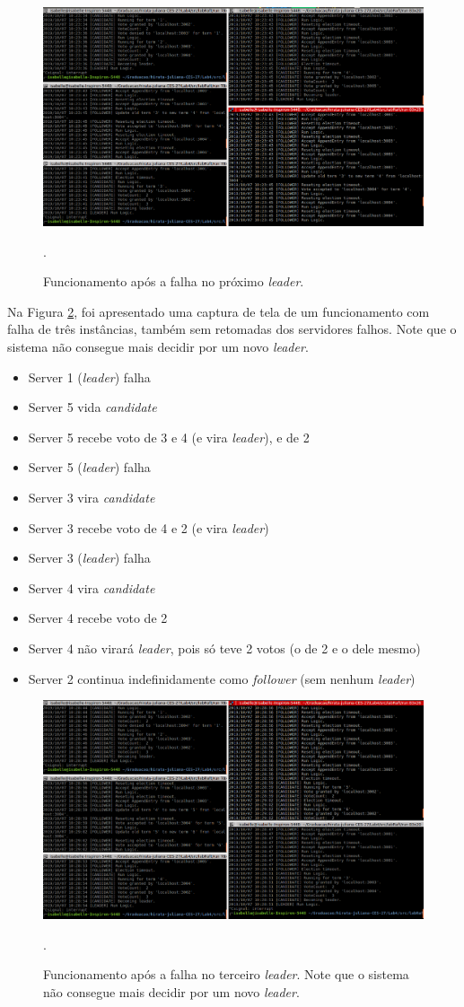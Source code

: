 \documentclass[journal,onecolumn]{IEEEtran}
\begin{document}
\begin{figure}[H]
\centering
\centerline{\includegraphics[scale=0.4]{imagens/2_falhas.png}}
\caption{Funcionamento após a falha no próximo \textit{leader}.}.
\label{2_falhas}
\end{figure}

Na Figura \ref{3_falhas}, foi apresentado uma captura de tela de um funcionamento com falha de três instâncias, também sem retomadas dos servidores falhos. Note que o sistema não consegue mais decidir por um novo \textit{leader}.

\begin{itemize}
\item Server 1 (\textit{leader}) falha
\item Server 5 vida \textit{candidate}
\item Server 5 recebe voto de 3 e 4 (e vira \textit{leader}), e de 2
\item Server 5 (\textit{leader}) falha
\item Server 3 vira \textit{candidate}
\item Server 3 recebe voto de 4 e 2 (e vira \textit{leader})
\item Server 3 (\textit{leader}) falha
\item Server 4 vira \textit{candidate}
\item Server 4 recebe voto de 2
\item Server 4 não virará \textit{leader}, pois só teve 2 votos (o de 2 e o dele mesmo)
\item Server 2 continua indefinidamente como \textit{follower} (sem nenhum \textit{leader})
\end{itemize}

\begin{figure}[H]
\centering
\centerline{\includegraphics[scale=0.4]{imagens/3_falhas.png}}
\caption{Funcionamento após a falha no terceiro \textit{leader}. Note que o sistema não consegue mais decidir por um novo \textit{leader}.}.
\label{3_falhas}
\end{figure}
\end{document}
